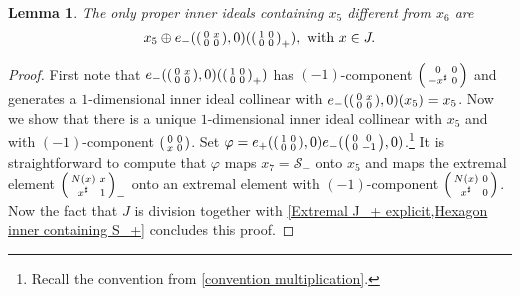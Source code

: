 \documentclass[oneside,a4paper]{amsart} %
\newtheorem{lemma}[theorem]{Lemma}
\theoremstyle{definition}
\renewcommand{\SS}{\mathcal{S}}
\numberwithin{equation}{section}
\begin{document}
\begin{lemma}
\label{Lines through x8}
	The only proper inner ideals containing $x_5$ different from $x_6$ are 
	\[ x_5\oplus e_-(\begin{psmallmatrix} 0&x\\0&0 \end{psmallmatrix},0)(\begin{psmallmatrix} 1&0\\0&0 \end{psmallmatrix}_+), \text{ with } x\in J.\]
\end{lemma}
\begin{proof}
	First note that $e_-(\begin{psmallmatrix} 0&x\\0&0 \end{psmallmatrix},0)(\begin{psmallmatrix} 1&0\\0&0 \end{psmallmatrix}_+)$ has $(-1)$-component $\begin{psmallmatrix} 0&0\\-x^\sharp &0 \end{psmallmatrix}$ and generates a $1$-dimensional inner ideal collinear with $e_-(\begin{psmallmatrix} 0&x\\0&0 \end{psmallmatrix},0)(x_5)=x_5$.
	Now we show that there is a unique $1$-dimensional inner ideal collinear with $x_5$ and with $(-1)$-component $\begin{psmallmatrix} 0&0\\x&0 \end{psmallmatrix}$.
	Set $\varphi=e_+(\begin{psmallmatrix} 1&0\\0&0 \end{psmallmatrix},0)e_-(\begin{psmallmatrix} 0&0\\0&-1 \end{psmallmatrix},0)$.\footnote{Recall the convention from \cref{convention multiplication}.} 
	It is straightforward to compute that $\varphi$ maps $x_7=\SS_-$ onto $x_5$ and maps the extremal element $\begin{psmallmatrix} N(x)&x\\x^\sharp&1 \end{psmallmatrix}_-$ onto an extremal element with $(-1)$-component $\begin{psmallmatrix} N(x)&0\\x^\sharp&0 \end{psmallmatrix}$.
	Now the fact that $J$ is division together with \cref{Extremal J_+ explicit,Hexagon inner containing S_+} concludes this proof.
\end{proof}
\end{document}
